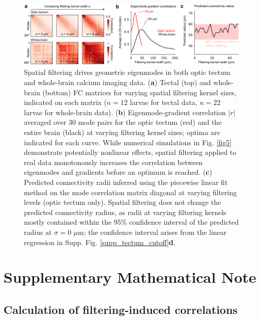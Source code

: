 \documentclass{article}
\begin{document}
\begin{figure}[t]
    \centering
    \includegraphics[width=1.0\linewidth]{figures/supp_smoothing.pdf}
    \caption{Spatial filtering drives geometric eigenmodes in both optic tectum and whole-brain calcium imaging data. (\textbf{a}) Tectal (top) and whole-brain (bottom) FC matrices for varying spatial filtering kernel sizes, indicated on each matrix ($n=12$ larvae for tectal data, $n=22$ larvae for whole-brain data). (\textbf{b}) Eigenmode-gradient correlation $|r|$ averaged over 30 mode pairs for the optic tectum (red) and the entire brain (black) at varying filtering kernel sizes; optima are indicated for each curve. While numerical simulations in Fig. \ref{fig5} demonstrate potentially nonlinear effects, spatial filtering applied to real data monotonously increases the correlation between eigenmodes and gradients before an optimum is reached. (\textbf{c}) Predicted connectivity radii inferred using the piecewise linear fit method on the mode correlation matrix diagonal at varying filtering levels (optic tectum only). Spatial filtering does not change the predicted connectivity radius, as radii at varying filtering kernels mostly contained within the 95\% confidence interval of the predicted radius at $\sigma=0$ $\mu$m; the confidence interval arises from the linear regression in Supp. Fig. \ref{supp_tectum_cutoff}\textbf{d}.}
    \label{supp_smoothing}
\end{figure}

\newpage
\clearpage

\section*{Supplementary Mathematical Note}

\subsection*{Calculation of filtering-induced correlations}
\end{document}
